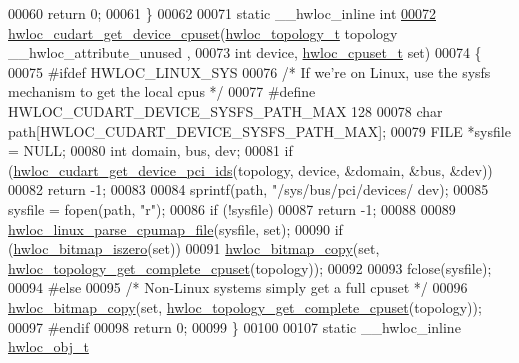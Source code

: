 \begin{DoxyCode}
00060   \textcolor{keywordflow}{return} 0;
00061 \}
00062 
00071 \textcolor{keyword}{static} \_\_hwloc\_inline \textcolor{keywordtype}{int}
\hypertarget{a00029_source_l00072}{}\hyperlink{a00072_ga2daaf1dd1a9a7f11ccbc6821374120e9}{00072} \hyperlink{a00072_ga2daaf1dd1a9a7f11ccbc6821374120e9}{hwloc_cudart_get_device_cpuset}(\hyperlink{a00039_ga9d1e76ee15a7dee158b786c30b6a6e38}{hwloc_topology_t} topology \_\_hwloc\_attribute\_unused
      ,
00073                                \textcolor{keywordtype}{int} device, \hyperlink{a00040_ga4bbf39b68b6f568fb92739e7c0ea7801}{hwloc_cpuset_t} \textcolor{keyword}{set})
00074 \{
00075 \textcolor{preprocessor}{#ifdef HWLOC\_LINUX\_SYS}
00076 \textcolor{preprocessor}{}  \textcolor{comment}{/* If we're on Linux, use the sysfs mechanism to get the local cpus */}
00077 \textcolor{preprocessor}{#define HWLOC\_CUDART\_DEVICE\_SYSFS\_PATH\_MAX 128}
00078 \textcolor{preprocessor}{}  \textcolor{keywordtype}{char} path[HWLOC\_CUDART\_DEVICE\_SYSFS\_PATH\_MAX];
00079   FILE *sysfile = NULL;
00080   \textcolor{keywordtype}{int} domain, bus, dev;
00081   \textcolor{keywordflow}{if} (\hyperlink{a00072_ga1cbf127459986c345f873e2752ddf681}{hwloc_cudart_get_device_pci_ids}(topology, device, &domain, &bus, &dev))
00082     \textcolor{keywordflow}{return} -1;
00083 
00084   sprintf(path, \textcolor{stringliteral}{"/sys/bus/pci/devices/%
      dev);
00085   sysfile = fopen(path, \textcolor{stringliteral}{"r"});
00086   \textcolor{keywordflow}{if} (!sysfile)
00087     \textcolor{keywordflow}{return} -1;
00088 
00089   \hyperlink{a00067_gaeacad897c30dbea284948374ad4b010c}{hwloc_linux_parse_cpumap_file}(sysfile, \textcolor{keyword}{set});
00090   \textcolor{keywordflow}{if} (\hyperlink{a00065_gaa94fed35d2a598bc4a8657b6955b7bf5}{hwloc_bitmap_iszero}(\textcolor{keyword}{set}))
00091     \hyperlink{a00065_gab14743355fa03b36cef521cbcd2fbf64}{hwloc_bitmap_copy}(\textcolor{keyword}{set}, \hyperlink{a00060_ga418ebb39eaf1eac8f9cf4047cf59a534}{hwloc_topology_get_complete_cpuset}(topology));
00092 
00093   fclose(sysfile);
00094 \textcolor{preprocessor}{#else}
00095 \textcolor{preprocessor}{}  \textcolor{comment}{/* Non-Linux systems simply get a full cpuset */}
00096   \hyperlink{a00065_gab14743355fa03b36cef521cbcd2fbf64}{hwloc_bitmap_copy}(\textcolor{keyword}{set}, \hyperlink{a00060_ga418ebb39eaf1eac8f9cf4047cf59a534}{hwloc_topology_get_complete_cpuset}(topology));
00097 \textcolor{preprocessor}{#endif}
00098 \textcolor{preprocessor}{}  \textcolor{keywordflow}{return} 0;
00099 \}
00100 
00107 \textcolor{keyword}{static} \_\_hwloc\_inline \hyperlink{a00016}{hwloc_obj_t}
}
\end{DoxyCode}
